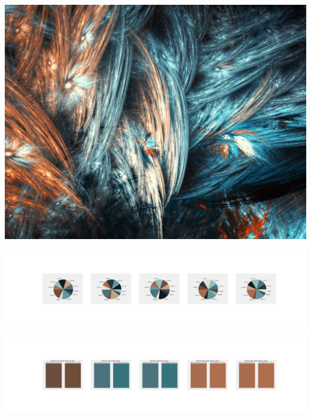 \documentclass[11pt]{article}
\begin{document}
\begin{landscape}
    \begin{center}
    \includegraphics[width=\textwidth]{./nbimg/file (135).jpg}
    \end{center}

    \begin{center}
    \includegraphics[width=250mm]{./nbimg/pie-40.jpg}
    \end{center}

    \begin{center}
    \includegraphics[width=250mm]{./nbimg/peak-40.jpg}
    \end{center}
    


\end{landscape}
\end{document}
